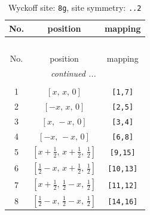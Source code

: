 \documentclass[fleqn,8pt]{jsarticle}
\begin{document}
\renewcommand{\arraystretch}{1.2}
\begin{longtable}{ccc}
\caption{Wyckoff site: {\tt 8g}, site symmetry: {\tt ..2}}
 \\
 \hline \hline
No. & position & mapping \\ \hline \endfirsthead

\multicolumn{2}{l}{\tablename\ \thetable{}} \\
 \hline \hline
No. & position & mapping \\ \hline \endhead

 \hline \hline
\multicolumn{2}{r}{\footnotesize\it continued ...} \\ \endfoot

 \hline \hline
\multicolumn{2}{r}{} \\ \endlastfoot

1 & $\left[ x,\, x,\, 0 \right]$ & {\tt [1,7]} \\ \hline
2 & $\left[ - x,\, x,\, 0 \right]$ & {\tt [2,5]} \\ \hline
3 & $\left[ x,\, - x,\, 0 \right]$ & {\tt [3,4]} \\ \hline
4 & $\left[ - x,\, - x,\, 0 \right]$ & {\tt [6,8]} \\ \hline
5 & $\left[ x + \frac{1}{2},\, x + \frac{1}{2},\, \frac{1}{2} \right]$ & {\tt [9,15]} \\ \hline
6 & $\left[ \frac{1}{2} - x,\, x + \frac{1}{2},\, \frac{1}{2} \right]$ & {\tt [10,13]} \\ \hline
7 & $\left[ x + \frac{1}{2},\, \frac{1}{2} - x,\, \frac{1}{2} \right]$ & {\tt [11,12]} \\ \hline
8 & $\left[ \frac{1}{2} - x,\, \frac{1}{2} - x,\, \frac{1}{2} \right]$ & {\tt [14,16]} \\
\end{longtable}
\renewcommand{\arraystretch}{1.2}
\end{document}
